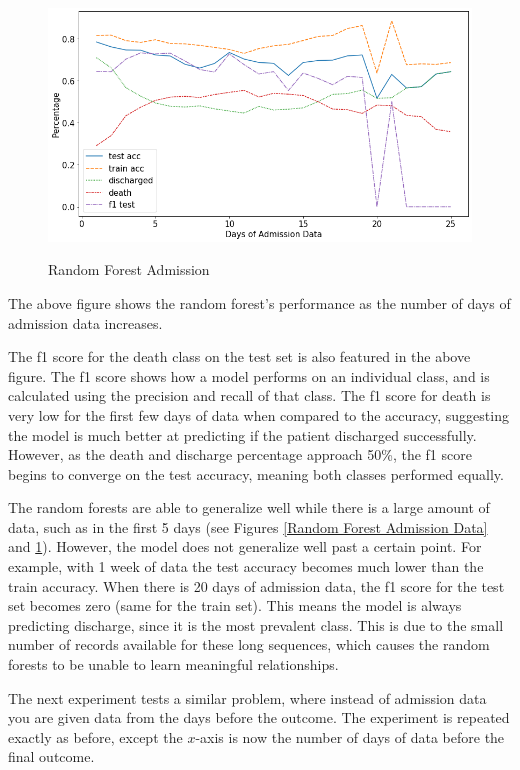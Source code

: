 \documentclass[12pt]{article}
\begin{document}
\begin{figure}[H]
\centering\caption{Random Forest Admission}
\includegraphics[scale=0.52]{Random Forest Admission.png}
\label{Random Forest Admission}
\end{figure}
The above figure shows the random forest's performance as the number of days of admission data increases. 

The f1 score for the death class on the test set is also featured in the above figure. The f1 score shows how a model performs on an individual class, and is calculated using the precision and recall of that class. The f1 score for death is very low for the first few days of data when compared to the accuracy, suggesting the model is much better at predicting if the patient discharged successfully. However, as the death and discharge percentage approach 50\%, the f1 score begins to converge on the test accuracy, meaning both classes performed equally. %

The random forests are able to generalize well while there is a large amount of data, such as in the first 5 days (see Figures \ref{Random Forest Admission Data} and \ref{Random Forest Admission}). However, the model does not generalize well past a certain point. For example, with 1 week of data the test accuracy becomes much lower than the train accuracy. When there is 20 days of admission data, the f1 score for the test set becomes zero (same for the train set). This means the model is always predicting discharge, since it is the most prevalent class. This is due to the small number of records available for these long sequences, which causes the random forests to be unable to learn meaningful relationships.

The next experiment tests a similar problem, where instead of admission data you are given data from the days before the outcome. The experiment is repeated exactly as before, except the $x$-axis is now the number of days of data before the final outcome.
\end{document}
